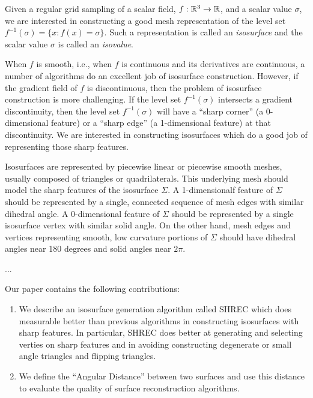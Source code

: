 

\maketitle

Given a regular grid sampling of a scalar field, $f: \mathbb{R}^{3} \rightarrow \mathbb{R}$,
and a scalar value $\sigma$,
we are interested in constructing a good mesh representation
of the level set $f^{-1}(\sigma) = \{x : f(x) = \sigma \}$.
Such a representation is called an {\em isosurface} 
and the scalar value $\sigma$ is called an {\em isovalue}.

When $f$ is smooth,
i.e., when $f$ is continuous and its derivatives are continuous,
a number of algorithms do an excellent job of isosurface construction.
However, if the gradient field of $f$ is discontinuous,
then the problem of isosurface construction is more challenging.
If the level set $f^{-1}(\sigma)$ intersects a gradient discontinuity,
then the level set $f^{-1}(\sigma)$ will have a ``sharp corner''
(a 0-dimensional feature) or a ``sharp edge'' (a 1-dimensional feature)
at that discontinuity.
We are interested in constructing isosurfaces
which do a good job of representing those sharp features.

Isosurfaces are represented by piecewise linear or piecewise smooth meshes,
usually composed of triangles or quadrilaterals.
This underlying mesh should model the sharp features
of the isosurface $\Sigma$.
A 1-dimensionalf feature of $\Sigma$ should be represented by a single, 
connected sequence of mesh edges with similar dihedral angle.
A 0-dimensional feature of $\Sigma$ should be represented by a single
isosurface vertex with similar solid angle.
On the other hand, mesh edges and vertices
representing smooth, low curvature portions of $\Sigma$ should have
dihedral angles near 180 degrees and solid angles near $2 \pi$.

...

Our paper contains the following contributions:
\begin{enumerate}
\item We describe an isosurface generation algorithm
called SHREC which does measurable better than previous algorithms
in constructing isosurfaces with sharp features.
In particular, SHREC does better at generating and selecting verties 
on sharp features and in avoiding constructing degenerate 
or small angle triangles and flipping triangles.
\item We define the ``Angular Distance'' between two surfaces
and use this distance to evaluate the quality 
of surface reconstruction algorithms.
\end{enumerate}

